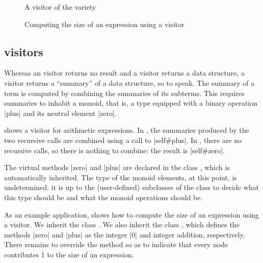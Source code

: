 \documentclass[11pt,a4paper,twoside]{article}
\begin{document}

\begin{figure}[p]
\vspace{-\baselineskip}
\caption{A visitor of the \reduce variety}
\label{fig:expr15}
\end{figure}

\begin{figure}[t]
\caption{Computing the size of an expression using a \reduce visitor}
\label{fig:reduce}
\end{figure}

\subsection{\reduce visitors}
\label{sec:intro:reduce}

Whereas an \iter visitor returns no result and a \map visitor returns a data
structure, a \reduce visitor returns a ``summary'' of a data structure, so to
speak. The summary of a term is computed by combining the summaries of its
subterms. This requires summaries to inhabit a monoid, that is, a type
equipped with a binary operation \oc|plus| and its neutral element \oc|zero|.

 shows a \reduce visitor for arithmetic expressions. In
, the summaries produced by the two recursive calls are
combined using a call to \oc|self#plus|. In , there are
no recursive calls, so there is nothing to combine: the result is
\oc|self#zero|.

The virtual methods \oc|zero| and \oc|plus| are declared in the class
, which is automatically inherited. The type of the
monoid elements, at this point, is undetermined: it is up to the
(user-defined) subclasses of the class \reduce to decide what this type should
be and what the monoid operations should be.

As an example application,  shows how to compute the size of
an expression using a \reduce visitor. We inherit the class \reduce. We also
inherit the class , which defines the
methods \oc|zero| and \oc|plus| as the integer \oc|0| and integer addition,
respectively. There remains to override the method  so as
to indicate that every node contributes 1 to the size of an expression.
\end{document}
